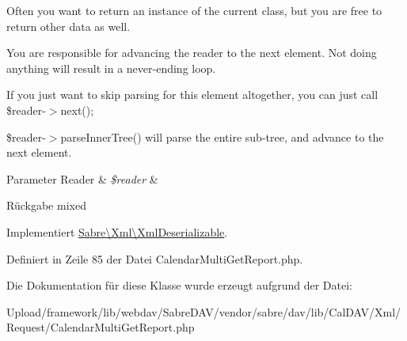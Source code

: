 Often you want to return an instance of the current class, but you are free to return other data as well.

You are responsible for advancing the reader to the next element. Not doing anything will result in a never-\/ending loop.

If you just want to skip parsing for this element altogether, you can just call \$reader-\/$>$next();

\$reader-\/$>$parse\+Inner\+Tree() will parse the entire sub-\/tree, and advance to the next element.


\begin{DoxyParams}[1]{Parameter}
Reader & {\em \$reader} & \\
\hline
\end{DoxyParams}
\begin{DoxyReturn}{Rückgabe}
mixed 
\end{DoxyReturn}


Implementiert \mbox{\hyperlink{interface_sabre_1_1_xml_1_1_xml_deserializable_a19e0eca545b9a0d93f7d6b69085ade30}{Sabre\textbackslash{}\+Xml\textbackslash{}\+Xml\+Deserializable}}.



Definiert in Zeile 85 der Datei Calendar\+Multi\+Get\+Report.\+php.



Die Dokumentation für diese Klasse wurde erzeugt aufgrund der Datei\+:\begin{DoxyCompactItemize}
\item 
Upload/framework/lib/webdav/\+Sabre\+D\+A\+V/vendor/sabre/dav/lib/\+Cal\+D\+A\+V/\+Xml/\+Request/Calendar\+Multi\+Get\+Report.\+php\end{DoxyCompactItemize}
